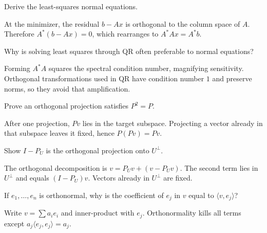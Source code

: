 \begin{problem}\label{prob:i14-problem-06}
Derive the least-squares normal equations.
\end{problem}
\begin{solution}
At the minimizer, the residual $b-Ax$ is orthogonal to the column space of $A$. Therefore $A^*(b-Ax)=0$, which rearranges to $A^*Ax=A^*b$.
\end{solution}

\begin{problem}\label{prob:i14-problem-07}
Why is solving least squares through QR often preferable to normal equations?
\end{problem}
\begin{solution}
Forming $A^*A$ squares the spectral condition number, magnifying sensitivity. Orthogonal transformations used in QR have condition number $1$ and preserve norms, so they avoid that amplification.
\end{solution}

\begin{problem}\label{prob:i14-problem-08}
Prove an orthogonal projection satisfies $P^2=P$.
\end{problem}
\begin{solution}
After one projection, $Pv$ lies in the target subspace. Projecting a vector already in that subspace leaves it fixed, hence $P(Pv)=Pv$.
\end{solution}

\begin{problem}\label{prob:i14-problem-09}
Show $I-P_U$ is the orthogonal projection onto $U^\perp$.
\end{problem}
\begin{solution}
The orthogonal decomposition is $v=P_Uv+(v-P_Uv)$. The second term lies in $U^\perp$ and equals $(I-P_U)v$. Vectors already in $U^\perp$ are fixed.
\end{solution}

\begin{problem}\label{prob:i14-problem-10}
If $e_1,\dots,e_n$ is orthonormal, why is the coefficient of $e_j$ in $v$ equal to $\langle v,e_j\rangle$?
\end{problem}
\begin{solution}
Write $v=\sum a_ie_i$ and inner-product with $e_j$. Orthonormality kills all terms except $a_j\langle e_j,e_j\rangle=a_j$.
\end{solution}

